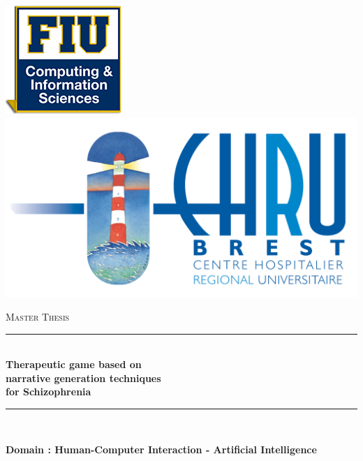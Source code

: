 \documentclass[11pt]{article}
\newcommand{\HRule}{\rule{\linewidth}{0.5mm}}
\begin{document}
\begin{titlepage}
\begin{center}
\includegraphics[height=0.1\textheight]{./logos/fiu}
\includegraphics[height=0.1\textheight]{./logos/CHRU_Brest}


  
\vspace{1cm} 
\textsc{\Large Master Thesis }\\[0.5cm]


\HRule \\[0.4cm]
{ \Large \bfseries Therapeutic game based on }\\[0.4cm]
{ \Large \bfseries narrative generation techniques }\\[0.4cm]
{ \Large \bfseries for Schizophrenia }\\[0.2cm]
\HRule \\[1.5cm]
\begin{flushleft}
\textbf{Domain : Human-Computer Interaction - Artificial Intelligence \\[1cm]}
\end{flushleft}


\end{center}
\end{titlepage}
\end{document}
